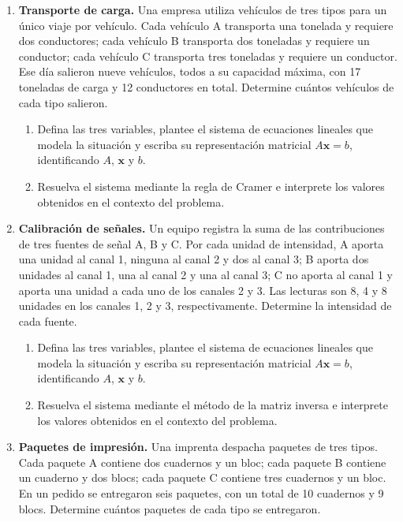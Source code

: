 \documentclass[11pt,a4paper]{article}
\begin{document}
\begin{enumerate}
\begin{enumerate}
    \item Defina las tres variables, plantee el sistema de ecuaciones lineales que modela la situación y escriba su representación matricial $A\mathbf{x}=b$, identificando $A$, $\mathbf{x}$ y $b$.
    \item Resuelva el sistema mediante el método de la matriz inversa e interprete los valores obtenidos en el contexto del problema.
\end{enumerate}
\newpage
\item \textbf{Transporte de carga.} Una empresa utiliza vehículos de tres tipos para un único viaje por vehículo. Cada vehículo A transporta una tonelada y requiere dos conductores; cada vehículo B transporta dos toneladas y requiere un conductor; cada vehículo C transporta tres toneladas y requiere un conductor. Ese día salieron nueve vehículos, todos a su capacidad máxima, con 17 toneladas de carga y 12 conductores en total. Determine cuántos vehículos de cada tipo salieron.

\begin{enumerate}
    \item Defina las tres variables, plantee el sistema de ecuaciones lineales que modela la situación y escriba su representación matricial $A\mathbf{x}=b$, identificando $A$, $\mathbf{x}$ y $b$.
    \item Resuelva el sistema mediante la regla de Cramer e interprete los valores obtenidos en el contexto del problema.
\end{enumerate}
\item \textbf{Calibración de señales.} Un equipo registra la suma de las contribuciones de tres fuentes de señal A, B y C. Por cada unidad de intensidad, A aporta una unidad al canal 1, ninguna al canal 2 y dos al canal 3; B aporta dos unidades al canal 1, una al canal 2 y una al canal 3; C no aporta al canal 1 y aporta una unidad a cada uno de los canales 2 y 3. Las lecturas son 8, 4 y 8 unidades en los canales 1, 2 y 3, respectivamente. Determine la intensidad de cada fuente.

\begin{enumerate}
    \item Defina las tres variables, plantee el sistema de ecuaciones lineales que modela la situación y escriba su representación matricial $A\mathbf{x}=b$, identificando $A$, $\mathbf{x}$ y $b$.
    \item Resuelva el sistema mediante el método de la matriz inversa e interprete los valores obtenidos en el contexto del problema.
\end{enumerate}
\item \textbf{Paquetes de impresión.} Una imprenta despacha paquetes de tres tipos. Cada paquete A contiene dos cuadernos y un bloc; cada paquete B contiene un cuaderno y dos blocs; cada paquete C contiene tres cuadernos y un bloc. En un pedido se entregaron seis paquetes, con un total de 10 cuadernos y 9 blocs. Determine cuántos paquetes de cada tipo se entregaron.


\end{enumerate}
\end{document}
